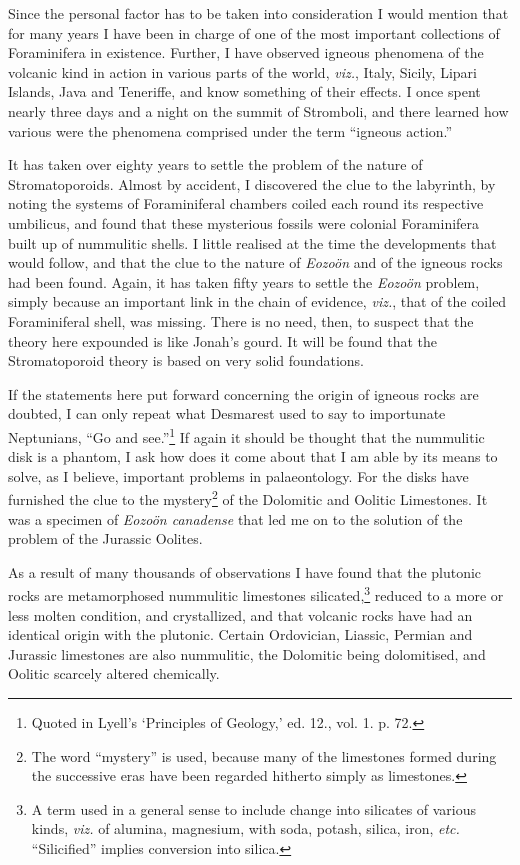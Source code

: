 \documentclass[a4paper, 12pt, oneside]{article}
\begin{document}
Since the personal factor has to be taken into consideration I would mention that for many years I have been in charge of one of the most important collections of Foraminifera in existence. Further, I have observed igneous phenomena of the volcanic kind in action in various parts of the world, \emph{viz.}, Italy, Sicily, Lipari Islands, Java and Teneriffe, and know something of their effects. I once spent nearly three days and a night on the summit of Stromboli, and there learned how various were the phenomena comprised under the term ``igneous action.''

It has taken over eighty years to settle the problem of the nature of Stromatoporoids. Almost by accident, I discovered the clue to the labyrinth, by noting the systems of Foraminiferal chambers coiled each round its respective umbilicus, and found that these mysterious fossils were colonial Foraminifera built up of nummulitic shells. I little realised at the time the developments that would follow, and that the clue to the nature of \emph{Eozoön} and of the igneous rocks had been found. Again, it has taken fifty years to settle the \emph{Eozoön} problem, simply because an important link in the chain of evidence, \emph{viz.}, that of the coiled Foraminiferal shell, was missing. There is no need, then, to suspect that the theory here expounded is like Jonah's gourd. It will be found that the Stromatoporoid theory is based on very solid foundations.

If the statements here put forward concerning the origin of igneous rocks are doubted, I can only repeat what Desmarest used to say to importunate Neptunians, ``Go and see.''\footnote{Quoted in Lyell's `Principles of Geology,' ed. 12., vol. 1. p. 72.} If again it should be thought that the nummulitic disk is a phantom, I ask how does it come about that I am able by its means to solve, as I believe, important problems in palaeontology. For the disks have furnished the clue to the mystery\footnote{The word ``mystery'' is used, because many of the limestones formed during the successive eras have been regarded hitherto simply as limestones.} of the Dolomitic and Oolitic Limestones. It was a specimen of \emph{Eozoön canadense} that led me on to the solution of the problem of the Jurassic Oolites.

As a result of many thousands of observations I have found that the plutonic rocks are metamorphosed nummulitic limestones silicated,\footnote{A term used in a general sense to include change into silicates of various kinds, \emph{viz.} of alumina, magnesium, with soda, potash, silica, iron, \emph{etc.} ``Silicified'' implies conversion into silica.} reduced to a more or less molten condition, and crystallized, and that volcanic rocks have had an identical origin with the plutonic. Certain Ordovician, Liassic, Permian and Jurassic limestones are also nummulitic, the Dolomitic being dolomitised, and Oolitic scarcely altered chemically.
\end{document}

